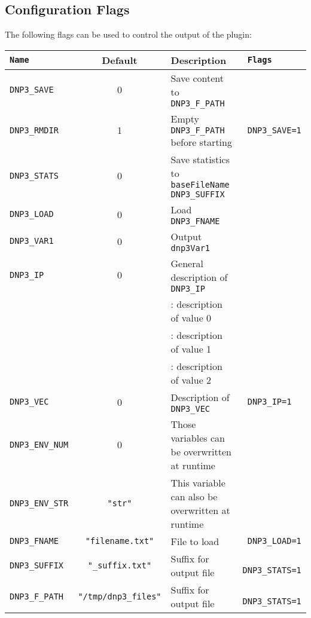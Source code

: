 \documentclass[documentation]{subfiles}
\begin{document}
\subsection{Configuration Flags}
The following flags can be used to control the output of the plugin:
\begin{longtable}{>{\tt}lcl>{\tt\small}l}
    \toprule
    {\bf Name} & {\bf Default} & {\bf Description} & {\bf Flags}\\
    \midrule\endhead%
    DNP3\_SAVE     & 0 & Save content to {\tt DNP3\_F\_PATH}                & \\
    DNP3\_RMDIR    & 1 & Empty {\tt DNP3\_F\_PATH} before starting          & DNP3\_SAVE=1\\ %
    DNP3\_STATS    & 0 & Save statistics to {\tt baseFileName DNP3\_SUFFIX} & \\
    DNP3\_LOAD     & 0 & Load {\tt DNP3\_FNAME}                             & \\
    DNP3\_VAR1     & 0 & Output {\tt dnp3Var1}                              & \\
    DNP3\_IP       & 0 & General description of {\tt DNP3\_IP}              & \\
                      &   & \qquad 0: description of value 0                      & \\
                      &   & \qquad 1: description of value 1                      & \\
                      &   & \qquad 2: description of value 2                      & \\
    DNP3\_VEC      & 0 & Description of {\tt DNP3\_VEC}                     & DNP3\_IP=1   \\ %
    DNP3\_ENV\_NUM & 0 & Those variables can be overwritten at runtime         & \\
    DNP3\_ENV\_STR & {\tt\small "str"}
                          & This variable can also be overwritten at runtime      & \\
    DNP3\_FNAME    & {\tt\small "filename.txt"}
                          & File to load                                          & DNP3\_LOAD=1 \\ %
    DNP3\_SUFFIX   & {\tt\small "\_suffix.txt"}
                          & Suffix for output file                                & DNP3\_STATS=1\\ %
    DNP3\_F\_PATH  & {\tt\small "/tmp/dnp3\_files"}
                          & Suffix for output file                                & DNP3\_STATS=1\\ %
    \bottomrule
\end{longtable}
\end{document}
